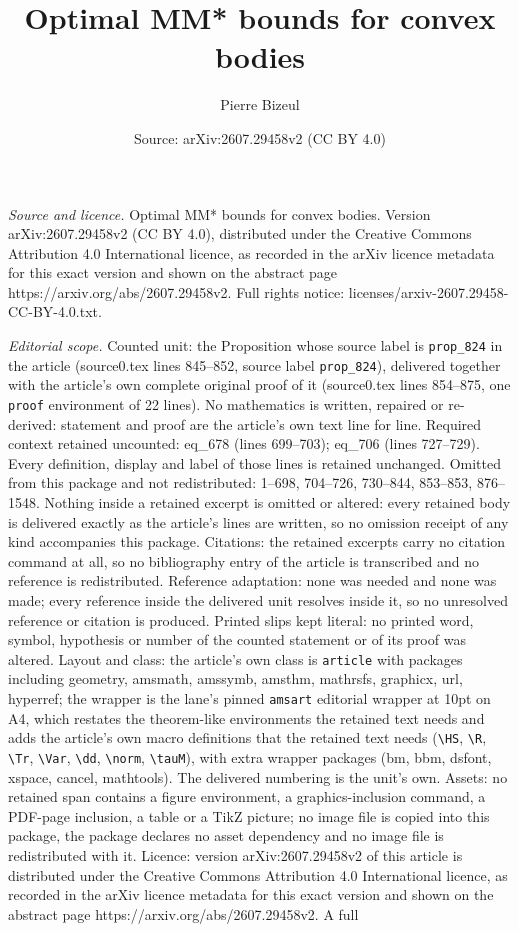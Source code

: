 \documentclass[10pt,a4paper]{amsart}
\title[Optimal MM* bounds for convex bodies]{Optimal MM* bounds for convex bodies}
\author{Pierre Bizeul}
\date{Source: arXiv:2607.29458v2 (CC BY 4.0)}
\begin{document}
\maketitle

\noindent\emph{Source and licence.} Optimal MM* bounds for convex bodies. Version arXiv:2607.29458v2 (CC BY 4.0), distributed under the Creative Commons Attribution 4.0 International licence, as recorded in the arXiv licence metadata for this exact version and shown on the abstract page https://arxiv.org/abs/2607.29458v2. Full rights notice: licenses/arxiv-2607.29458-CC-BY-4.0.txt.\par\smallskip

\noindent\textit{Editorial scope.} Counted unit: the Proposition whose source label is \texttt{prop\_824} in the article (source0.tex lines 845--852, source label \texttt{prop\_824}), delivered together with the article's own complete original proof of it (source0.tex lines 854--875, one \texttt{proof} environment of 22 lines). No mathematics is written, repaired or re-derived: statement and proof are the article's own text line for line. Required context retained uncounted: eq\_678 (lines 699--703); eq\_706 (lines 727--729). Every definition, display and label of those lines is retained unchanged. Omitted from this package and not redistributed: 1--698, 704--726, 730--844, 853--853, 876--1548. Nothing inside a retained excerpt is omitted or altered: every retained body is delivered exactly as the article's lines are written, so no omission receipt of any kind accompanies this package. Citations: the retained excerpts carry no citation command at all, so no bibliography entry of the article is transcribed and no reference is redistributed. Reference adaptation: none was needed and none was made; every reference inside the delivered unit resolves inside it, so no unresolved reference or citation is produced. Printed slips kept literal: no printed word, symbol, hypothesis or number of the counted statement or of its proof was altered. Layout and class: the article's own class is \texttt{article} with packages including geometry, amsmath, amssymb, amsthm, mathrsfs, graphicx, url, hyperref; the wrapper is the lane's pinned \texttt{amsart} editorial wrapper at 10pt on A4, which restates the theorem-like environments the retained text needs and adds the article's own macro definitions that the retained text needs (\texttt{\textbackslash HS}, \texttt{\textbackslash R}, \texttt{\textbackslash Tr}, \texttt{\textbackslash Var}, \texttt{\textbackslash dd}, \texttt{\textbackslash norm}, \texttt{\textbackslash tauM}), with extra wrapper packages (bm, bbm, dsfont, xspace, cancel, mathtools). The delivered numbering is the unit's own. Assets: no retained span contains a figure environment, a graphics-inclusion command, a PDF-page inclusion, a table or a TikZ picture; no image file is copied into this package, the package declares no asset dependency and no image file is redistributed with it. Licence: version arXiv:2607.29458v2 of this article is distributed under the Creative Commons Attribution 4.0 International licence, as recorded in the arXiv licence metadata for this exact version and shown on the abstract page https://arxiv.org/abs/2607.29458v2. A full 
\end{document}
